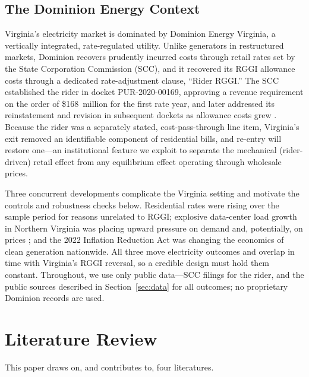 \documentclass[12pt]{article}
\begin{document}
\subsection{The Dominion Energy Context}\label{sec:dominion}
Virginia's electricity market is dominated by Dominion Energy Virginia, a vertically
integrated, rate-regulated utility. Unlike generators in restructured markets, Dominion
recovers prudently incurred costs through retail rates set by the State Corporation Commission
(SCC), and it recovered its RGGI allowance costs through a dedicated rate-adjustment clause,
``Rider RGGI.'' The SCC established the rider in docket PUR-2020-00169, approving a revenue
requirement on the order of \$168~million for the first rate year, and later addressed its
reinstatement and revision in subsequent dockets as allowance costs grew
\citep{DominionSCC_rider}. Because the rider was a separately stated, cost-pass-through line
item, Virginia's exit removed an identifiable component of residential bills, and re-entry
will restore one---an institutional feature we exploit to separate the mechanical
(rider-driven) retail effect from any equilibrium effect operating through wholesale prices.

Three concurrent developments complicate the Virginia setting and motivate the controls and
robustness checks below. Residential rates were rising over the sample period for reasons
unrelated to RGGI; explosive data-center load growth in Northern Virginia was placing upward
pressure on demand and, potentially, on prices \citep{LBNL_datacenters}; and the 2022
Inflation Reduction Act was changing the economics of clean generation nationwide. All three
move electricity outcomes and overlap in time with Virginia's RGGI reversal, so a credible
design must hold them constant. Throughout, we use only public data---SCC filings for the
rider, and the public sources described in Section~\ref{sec:data} for all outcomes; no
proprietary Dominion records are used.

\section{Literature Review}\label{sec:lit}
This paper draws on, and contributes to, four literatures.
\end{document}
